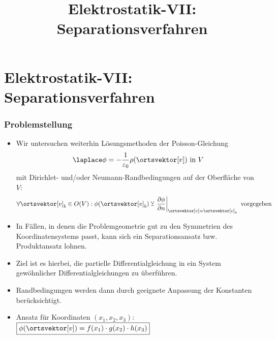 

\title[TET: Elektrostatik-VII: Separationsverfahren]{Elektrostatik-VII: Separationsverfahren}


% 
% 

\maketitle

% 
% 
\section{Elektrostatik-VII: Separationsverfahren}

\begin{frame}

  \frametitle{Problemstellung}
  \begin{itemize}[<+->]
  \item Wir untersuchen weiterhin Lösungsmethoden der \alert{Poisson-Gleichung}
    $$
    \laplace \phi = -\frac{1}{\varepsilon_0} \rho(\ortsvektor[v]) \text{ in } V
    $$
    mit \alert{Dirichlet-} und/oder \alert{Neumann-Randbedingungen} auf der Oberfläche von $V$:
    $$
    \forall \ortsvektor[v]_{b} \in O(V) : \phi(\ortsvektor[v]_b) \veebar \left. \frac{\partial \phi}{\partial n}\right|_{\ortsvektor[v]=\ortsvektor[v]_b} \text{ vorgegeben}
    $$
  \item In Fällen, in denen die Problemgeometrie gut zu den Symmetrien des Koordinatensystems passt, kann sich ein \alert{Separationsansatz} bzw. \alert{Produktansatz} lohnen.
  \item Ziel ist es hierbei, die partielle Differentialgleichung in ein System gewöhnlicher Differentialgleichungen zu überführen.
  \item Randbedingungen werden dann durch geeignete Anpassung der Konstanten berücksichtigt.
    \item Ansatz für Koordinaten $(x_1,x_2,x_3)$: $\boxed{\phi(\ortsvektor[v])= f(x_1) \cdot g(x_2) \cdot h(x_3) }$
    \end{itemize}
  
  \end{frame}

